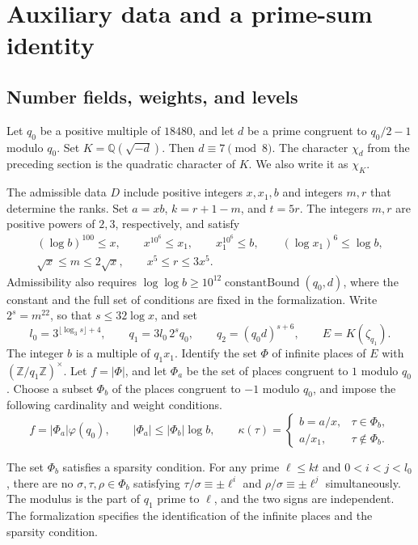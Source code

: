 \section{Auxiliary data and a prime-sum identity}\label{sec:data}

\subsection{Number fields, weights, and levels}

Let \(q_0\) be a positive multiple of \(18480\), and let \(d\) be a prime
congruent to \(q_0/2-1\) modulo \(q_0\). Set \(K=\mathbb Q(\sqrt{-d})\).
Then \(d\equiv7\pmod8\). The character \(\chi_d\) from the preceding section
is the quadratic character of \(K\). We also write it as \(\chi_K\).

The admissible data \(D\) include positive integers \(x,x_1,b\) and integers
\(m,r\) that determine the ranks. Set \(a=xb\), \(k=r+1-m\), and \(t=5r\).
The integers \(m,r\) are positive powers of \(2,3\), respectively, and satisfy
\begin{gather*}
 (\log b)^{100}\le x,\qquad
 x^{10^6}\le x_1,\qquad x_1^{10^6}\le b,\qquad
 (\log x_1)^6\le\log b,\\
 \sqrt{x}\le m\le 2\sqrt{x},\qquad x^5\le r\le 3x^5.
\end{gather*}
Admissibility also requires \(\log\log b\ge
10^{12}\operatorname{constantBound}(q_0,d)\), where the constant and the full
set of conditions are fixed in the formalization.
Write \(2^s=m^{22}\), so that \(s\le32\log x\), and set
\[
  l_0=3^{\lfloor\log_3 s\rfloor+4},\qquad
  q_1=3l_0\,2^s q_0,\qquad q_2=(q_0d)^{s+6},\qquad
  E=K(\zeta_{q_1}).
\]
The integer \(b\) is a multiple of \(q_1x_1\).
Identify the set \(\Phi\) of infinite places of \(E\) with
\((\mathbb Z/q_1\mathbb Z)^\times\). Let \(f=|\Phi|\), and let \(\Phi_a\)
be the set of places congruent to \(1\) modulo \(q_0\).
Choose a subset \(\Phi_b\) of the places congruent to \(-1\) modulo \(q_0\),
and impose the following cardinality and weight conditions.
\[
  f=|\Phi_a|\varphi(q_0),\qquad
  |\Phi_a|\le|\Phi_b|\log b,\qquad
  \kappa(\tau)=
  \begin{cases}
    b=a/x,&\tau\in\Phi_b,\\
    a/x_1,&\tau\notin\Phi_b.
  \end{cases}
\]

The set \(\Phi_b\) satisfies a sparsity condition. For any prime \(\ell\le kt\)
and \(0<i<j<l_0\), there are no \(\sigma,\tau,\rho\in\Phi_b\) satisfying
\(\tau/\sigma\equiv\pm\ell^i\) and \(\rho/\sigma\equiv\pm\ell^j\) simultaneously.
The modulus is the part of \(q_1\) prime to \(\ell\), and the two signs are independent.
The formalization specifies the identification of the infinite places
and the sparsity condition.

